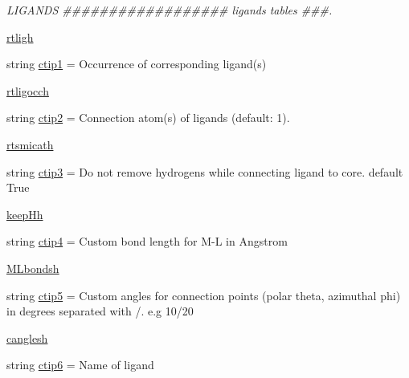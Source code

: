 \begin{DoxyCompactItemize}
\begin{DoxyCompactList}\small\item\em L\+I\+G\+A\+N\+DS \#\#\#\#\#\#\#\#\#\#\#\#\#\#\#\#\#\# ligands tables \#\#\#. \end{DoxyCompactList}\item 
\hyperlink{classmolSimplify_1_1Classes_1_1mGUI_1_1mGUI_af2a71a89722ed9d65b422d2e6a28f237}{rtligh}
\item 
string \hyperlink{classmolSimplify_1_1Classes_1_1mGUI_1_1mGUI_ae1052cd0c450b0885b619d6c44b11202}{ctip1} = \textquotesingle{}Occurrence of corresponding ligand(s)\textquotesingle{}
\item 
\hyperlink{classmolSimplify_1_1Classes_1_1mGUI_1_1mGUI_a57519951dcf714d2ee21834eb387abf3}{rtligocch}
\item 
string \hyperlink{classmolSimplify_1_1Classes_1_1mGUI_1_1mGUI_a92efe9218c4050ccebc86aae1147395f}{ctip2} = \textquotesingle{}Connection atom(s) of ligands (default\+: 1).\textquotesingle{}
\item 
\hyperlink{classmolSimplify_1_1Classes_1_1mGUI_1_1mGUI_a6bca89db3218915632fc29b71ba06350}{rtsmicath}
\item 
string \hyperlink{classmolSimplify_1_1Classes_1_1mGUI_1_1mGUI_ae4cd366d19560a68a036247fe71fc66e}{ctip3} = \textquotesingle{}Do not remove hydrogens while connecting ligand to core. default True\textquotesingle{}
\item 
\hyperlink{classmolSimplify_1_1Classes_1_1mGUI_1_1mGUI_a45359471fe9bf8bb40b3af7f7b37bbc2}{keep\+Hh}
\item 
string \hyperlink{classmolSimplify_1_1Classes_1_1mGUI_1_1mGUI_aecc80d28db4075ecaf235fe4f98e3931}{ctip4} = \textquotesingle{}Custom bond length for M-\/L in Angstrom\textquotesingle{}
\item 
\hyperlink{classmolSimplify_1_1Classes_1_1mGUI_1_1mGUI_a5c3e432196dae4e253a801f3689ad3ae}{M\+Lbondsh}
\item 
string \hyperlink{classmolSimplify_1_1Classes_1_1mGUI_1_1mGUI_ad7d493e575dd44eafe3f5715a0cb08a7}{ctip5} = \textquotesingle{}Custom angles for connection points (polar theta, azimuthal phi) in degrees separated with /. e.\+g 10/20\textquotesingle{}
\item 
\hyperlink{classmolSimplify_1_1Classes_1_1mGUI_1_1mGUI_a8b7ee22bce56134e7ce2532d62fe6585}{canglesh}
\item 
string \hyperlink{classmolSimplify_1_1Classes_1_1mGUI_1_1mGUI_ae40c9db22c039cd002cca5fbce947d55}{ctip6} = \textquotesingle{}Name of ligand\textquotesingle{}
\item 

\end{DoxyCompactItemize}
